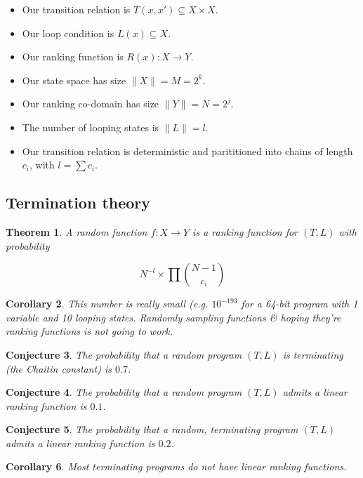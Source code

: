 \documentclass[preprint]{sigplanconf}
\newtheorem{theorem}{Theorem}
\newtheorem{corollary}[theorem]{Corollary}
\newtheorem{conjecture}[theorem]{Conjecture}
\theoremstyle{definition}
\begin{document}
\begin{itemize}
 \item Our transition relation is $T(x, x') \subseteq X \times X$.
 \item Our loop condition is $L(x) \subseteq X$.
 \item Our ranking function is $R(x) : X \to Y$.
 \item Our state space has size $\| X \| = M = 2^k$.
 \item Our ranking co-domain has size $\| Y \| = N = 2^j$.
 \item The number of looping states is $\| L \| = l$.
 \item Our transition relation is deterministic and parititioned into chains of length $c_i$, with $l = \sum c_i$.
\end{itemize}


\subsection{Termination theory}

\begin{theorem}
 A random function $f : X \to Y$ is a ranking function for $(T, L)$ with probability

 $$N^{-l} \times \prod {{N-1} \choose c_i}$$
\end{theorem}

\begin{corollary}
 This number is really small (e.g. $10^{-193}$ for a 64-bit program with 1 variable and 10 looping states.
 Randomly sampling functions \& hoping they're ranking functions is not going to work.
\end{corollary}


\begin{conjecture}
 The probability that a random program $(T, L)$ is terminating (the Chaitin constant)
 is $0.7$.
\end{conjecture}

\begin{conjecture}
 The probability that a random program $(T, L)$ admits a linear ranking function is
 $0.1$.
\end{conjecture}

\begin{conjecture}
 The probability that a random, terminating program $(T, L)$ admits a linear ranking function
 is $0.2$.
\end{conjecture}


\begin{corollary}
 Most terminating programs do not have linear ranking functions.
\end{corollary}
\end{document}

